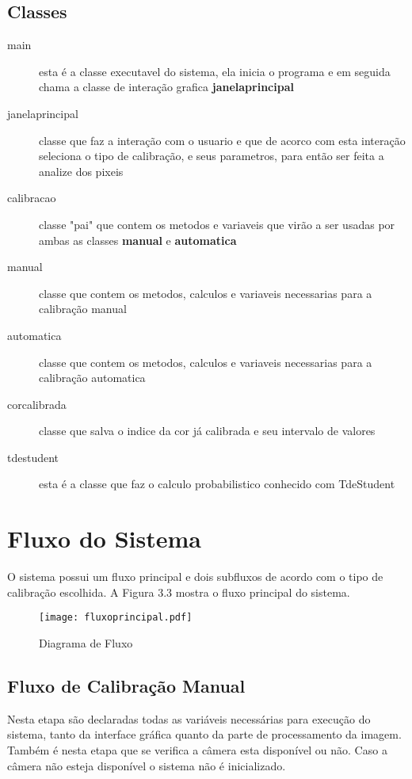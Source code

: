\subsection{Classes}
	\begin{description}

	\item [main] esta é a classe executavel do sistema, ela inicia o programa e em seguida chama a classe de interação grafica \textbf{janelaprincipal}  
	
	\item [janelaprincipal]	classe que faz a interação com o usuario e que de acorco com esta interação seleciona o tipo de calibração, e seus parametros, para então ser feita a analize dos pixeis	
		
	\item [calibracao] classe "pai" que contem os metodos e variaveis que virão a ser usadas por ambas as classes \textbf{manual} e \textbf{automatica}
	
	\item [manual] classe que contem os metodos, calculos e variaveis necessarias para a calibração manual
	
	\item [automatica] classe que contem os metodos, calculos e variaveis necessarias para a calibração automatica
			
	\item [corcalibrada] classe que salva o indice da cor já calibrada e seu intervalo de valores
	
	\item [tdestudent] esta é a classe que faz o calculo probabilistico conhecido com TdeStudent
	

	\end{description}

	

	\section{Fluxo do Sistema}
O sistema possui um fluxo principal e dois subfluxos de acordo com o tipo de calibração escolhida. A Figura 3.3 mostra o fluxo principal do sistema.
		\begin{figure}[!h]
			\centering
			\texttt{[image: fluxoprincipal.pdf]}
			\caption{Diagrama de Fluxo}
			\label{FlowCHart}
		\end{figure}
		
	\subsection{Fluxo de Calibração Manual}	
	Nesta etapa são declaradas todas as variáveis necessárias para execução do sistema, tanto da interface gráfica quanto da parte de processamento da imagem. Também é nesta etapa que se verifica a câmera esta disponível ou não. Caso a câmera não esteja disponível o sistema não é inicializado.
	
